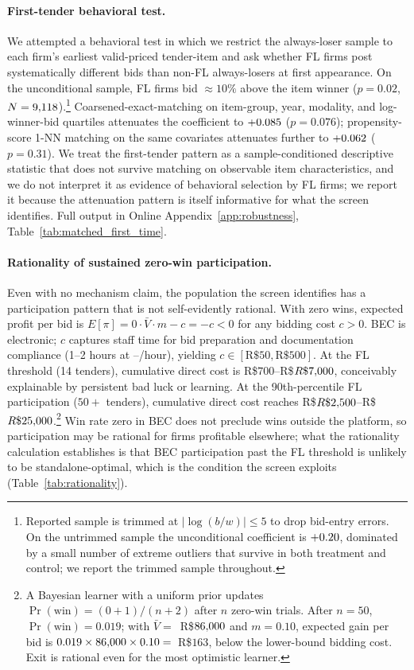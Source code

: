 \paragraph{First-tender behavioral test.} We attempted a
behavioral test in which we restrict the always-loser sample
to each firm's earliest valid-priced tender-item and ask
whether FL firms post systematically different bids than
non-FL always-losers at first appearance. On the unconditional
sample, FL firms bid $\approx 10\%$ above the item winner
($p = 0.02$, $N = 9{,}118$).\footnote{Reported sample is
trimmed at $|\log(b/w)| \leq 5$ to drop bid-entry errors. On
the untrimmed sample the unconditional coefficient is
$+0.20$, dominated by a small number of extreme outliers
that survive in both treatment and control; we report the
trimmed sample throughout.} Coarsened-exact-matching on
item-group, year, modality, and log-winner-bid quartiles
attenuates the coefficient to $+0.085$ ($p = 0.076$);
propensity-score 1-NN matching on the same covariates
attenuates further to $+0.062$ ($p = 0.31$). We treat the
first-tender pattern as a sample-conditioned descriptive
statistic that does not survive matching on observable item
characteristics, and we do not interpret it as evidence of
behavioral selection by FL firms; we report it because the
attenuation pattern is itself informative for what the screen
identifies. Full output in Online
Appendix~\ref{app:robustness}, Table~\ref{tab:matched_first_time}.

\paragraph{Rationality of sustained zero-win participation.}
\label{sec:rationality}
Even with no mechanism claim, the population the screen
identifies has a participation pattern that is not
self-evidently rational. With zero wins, expected profit per
bid is $E[\pi] = 0 \cdot \bar{V} \cdot m - c = -c < 0$ for any
bidding cost $c > 0$. BEC is electronic; $c$ captures staff
time for bid preparation and documentation compliance (1--2
hours at \valBidCostLow--\valBidCostLow/hour), yielding $c \in
[\text{R\$}50, \text{R\$}500]$. At the FL threshold (14
tenders), cumulative direct cost is R\$$700$--R\$$R\$7{,}000$,
conceivably explainable by persistent bad luck or learning. At
the 90th-percentile FL participation ($50+$ tenders),
cumulative direct cost reaches
R\$$R\$2{,}500$--R\$$R\$25{,}000$.\footnote{A Bayesian learner with
a uniform prior updates
$\Pr(\text{win}) = (0+1)/(n+2)$ after $n$ zero-win trials.
After $n = 50$, $\Pr(\text{win}) = 0.019$; with $\bar{V} =
$~R\$$86{,}000$ and $m = 0.10$, expected gain per bid is
$0.019 \times 86{,}000 \times 0.10 = $~R\$$163$, below the
lower-bound bidding cost. Exit is rational even for the most
optimistic learner.} Win rate zero in BEC does not preclude
wins outside the platform, so participation may be rational
for firms profitable elsewhere; what the rationality
calculation establishes is that BEC participation past the FL
threshold is unlikely to be standalone-optimal, which is the
condition the screen exploits
\citep{asker2010leniency, marshall2012economics}
(Table~\ref{tab:rationality}).

